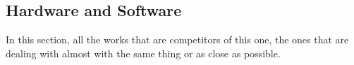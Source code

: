 \documentclass[../00_Main.tex]{subfiles}
\begin{document}
\subsection{Hardware and Software}
In this section, all the works that are competitors of this one, the ones that are dealing with almost with the same thing or as close as possible.

\biblio %
\end{document}
